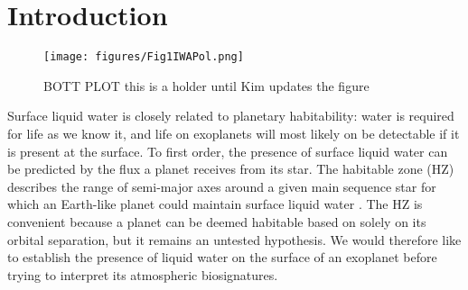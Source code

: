 \documentclass[
    usenatbib,
]{mnras}
\begin{document}
\section{Introduction}
\label{sec:intro}

\begin{figure*}%
   \centering
   \texttt{[image: figures/Fig1IWAPol.png]}
   \caption{BOTT PLOT this is a holder until Kim updates the figure}
    \label{fig:bottplot}
\end{figure*}



Surface liquid water is closely related to planetary habitability: water is required for life as we know it, and life on exoplanets will most likely on be detectable if it is present at the surface. 
To first order, the presence of surface liquid water can be predicted by the flux a planet receives from its star. The habitable zone (HZ) describes the range of semi-major axes around a given main sequence star for which an Earth-like planet could maintain surface liquid water \citep{kasting93}.  The HZ is convenient because a planet can be deemed habitable based on solely on its orbital separation, but it remains an untested hypothesis. We would therefore like to establish the presence of liquid water on the surface of an exoplanet before trying to interpret its atmospheric biosignatures. %


\end{document}

